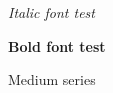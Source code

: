 \documentclass{article}
\begin{document}
\textit{Italic font test}

{\bfseries Bold font test}

{\mdseries Medium series}
\end{document}
